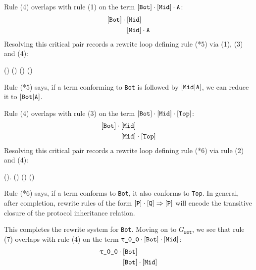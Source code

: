 \documentclass[../generics]{subfiles}
\begin{document}
\begin{example}
Rule (4) overlaps with rule (1) on the term $[\texttt{Bot}]\cdot[\texttt{Mid}]\cdot\texttt{A}$:
\begin{align*}
[\texttt{Bot}]\cdot{}&[\texttt{Mid}]\\
&[\texttt{Mid}]\cdot\texttt{A}
\end{align*}
Resolving this critical pair records a rewrite loop defining rule (*5) via (1), (3) and (4):
\begin{center}
\FourLoopDerived%
{\cdot{}\cdot\nA}%
{\cdot{}}%
{}%
{\cdot\nA}%
{\cdot()}%
{(\cdot{}\Rightarrow{})}%
{()}%
{()\cdot\nA}
\end{center}
Rule (*5) says, if a term conforming to \texttt{Bot} is followed by $[\texttt{Mid}|\texttt{A}]$, we can reduce it to $[\texttt{Bot}|\texttt{A}]$.

Rule (4) overlaps with rule (3) on the term $[\texttt{Bot}]\cdot[\texttt{Mid}]\cdot[\texttt{Top}]$:
\begin{align*}
[\texttt{Bot}]\cdot{}&[\texttt{Mid}]\\
&[\texttt{Mid}]\cdot[\texttt{Top}]
\end{align*}
Resolving this critical pair records a rewrite loop defining rule (*6) via rule (2) and (4):
\begin{center}
\FourLoopDerived%
{\cdot{}\cdot{}}%
{\cdot{}}%
{}%
{\cdot{}}%
{().}%
{()}%
{()}%
{\cdot()}
\end{center}
Rule (*6) says, if a term conforms to \texttt{Bot}, it also conforms to \texttt{Top}. In general, after completion, rewrite rules of the form $[\texttt{P}]\cdot[\texttt{Q}]\Rightarrow[\texttt{P}]$ will encode the transitive closure of the protocol inheritance relation.

This completes the rewrite system for \texttt{Bot}. Moving on to $G_\texttt{Bot}$, we see that rule (7) overlaps with rule (4) on the term $\rT\cdot\protosym{Bot}\cdot\protosym{Mid}$:
\begin{align*}
\rT\cdot{}&\protosym{Bot}\\
&\protosym{Bot}\cdot\protosym{Mid}
\end{align*}


\end{example}
\end{document}
